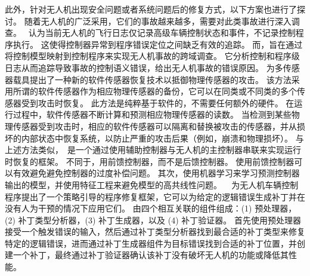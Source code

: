 此外，针对无人机出现安全问题或者系统问题后的修复方式，以下方案也进行了探讨。
随着无人机的广泛采用，它们的事故越来越多，需要对此类事故进行深入调查。
~\cite{mayday}认为当前无人机的飞行日志仅记录高级车辆控制状态和事件，不记录控制程序执行。
这使得控制器异常到程序错误定位之间缺乏有效的追踪。
而，旨在通过将控制模型映射到控制程序来实现无人机事故的跨域调查。
它分析控制和程序级日志从而追踪导致事故的控制语义错误，给出无人机事故的错误原因。
\citet{choi2020software}为多传感器载具提出了一种新的软件传感器恢复技术以抵御物理传感器的攻击。
该方法采用所谓的软件传感器作为相应物理传感器的备份，它可以在同类或不同类的多个传感器受到攻击时恢复。
此方法是纯粹基于软件的，不需要任何额外的硬件。
在运行过程中，软件传感器不断计算和预测相应物理传感器的读数。
当检测到某些物理传感器受到攻击时，相应的软件传感器可以隔离和替换被攻击的传感器，并从损坏的内部状态中恢复系统，以防止严重的攻击后果（例如，崩溃和物理损坏）。
与上述方法类似，~\cite{dash2021pid}是一个通过使用辅助控制器与无人机的主控制器串联来实现运行时恢复的框架。
不同于，用前馈控制器，而不是后馈控制器。
使用前馈控制器可以有效避免避免控制器的过度补偿问题。
其次，使用机器学习来学习预测控制器输出的模型，并使用特征工程来避免模型的高共线性问题。
~\cite{kim2022pgpatch} 为无人机车辆控制程序提出了一个策略引导的程序修复框架，它可以为给定的逻辑错误生成补丁并在没有人为干预的情况下应用它们。
由四个相互关联的组件组成：(1) 预处理器，(2) 补丁类型分析器，(3) 补丁生成器，以及 (4) 补丁验证器。
首先使用预处理器接受一个触发错误的输入，然后通过补丁类型分析器找到最合适的补丁类型来修复特定的逻辑错误，进而通过补丁生成器组件为目标错误找到合适的补丁位置，并创建一个补丁，最终通过补丁验证器确认该补丁没有破坏无人机的功能或降低其性能。





